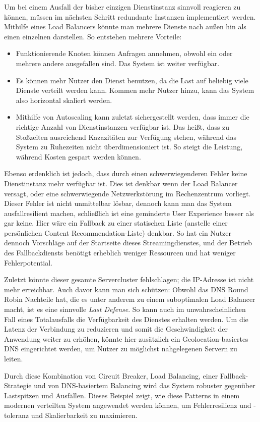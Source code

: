 Um bei einem Ausfall der bisher einzigen Dienstinstanz sinnvoll reagieren zu können, müssen im nächsten Schritt redundante Instanzen implementiert werden. Mithilfe eines Load Balancers könnte man mehrere Dienste nach außen hin als einen einzelnen darstellen. So entstehen mehrere Vorteile: 
\begin{itemize}
	\item Funktionierende Knoten können Anfragen annehmen, obwohl ein oder mehrere andere ausgefallen sind. Das System ist weiter verfügbar.
	\item Es können mehr Nutzer den Dienst benutzen, da die Last auf beliebig viele Dienste verteilt werden kann. Kommen mehr Nutzer hinzu, kann das System also horizontal skaliert werden.
	\item Mithilfe von Autoscaling kann zuletzt sichergestellt werden, dass immer die richtige Anzahl von Dienstinstanzen verfügbar ist. Das heißt, dass zu Stoßzeiten ausreichend Kazazitäten zur Verfügung stehen, während das System zu Ruhezeiten nicht überdimensioniert ist. So steigt die Leistung, während Kosten gespart werden können.
\end{itemize}

Ebenso erdenklich ist jedoch, dass durch einen schwerwiegenderen Fehler keine Dienstinstanz mehr verfügbar ist. Dies ist denkbar wenn der Load Balancer versagt, oder eine schwerwiegende Netzwerkstörung im Rechenzentrum vorliegt. Dieser Fehler ist nicht unmittelbar lösbar, dennoch kann man das System ausfallresilient machen, schließlich ist eine geminderte User Experience besser als gar keine. Hier wäre ein Fallback zu einer statischen Liste (anstelle einer persönlichen Content Recommendation-Liste) denkbar. So hat ein Nutzer dennoch Vorschläge auf der Startseite dieses Streamingdienstes, und der Betrieb des Fallbackdiensts benötigt erheblich weniger Ressourcen und hat weniger Fehlerpotential.

Zuletzt könnte dieser gesamte Servercluster fehlschlagen; die IP-Adresse ist nicht mehr erreichbar. Auch davor kann man sich schützen: Obwohl das DNS Round Robin Nachteile hat, die es unter anderem zu einem suboptimalen Load Balancer macht, ist es eine sinnvolle \textit{Last Defense}. So kann auch im unwahrscheinlichen Fall eines Totalausfalls die Verfügbarkeit des Dienstes erhalten werden. Um die Latenz der Verbindung zu reduzieren und somit die Geschwindigkeit der Anwendung weiter zu erhöhen, könnte hier zusätzlich ein Geolocation-basiertes DNS eingerichtet werden, um Nutzer zu möglichst nahgelegenen Servern zu leiten.

Durch diese Kombination von Circuit Breaker, Load Balancing, einer Fallback-Strategie und von DNS-basiertem Balancing wird das System robuster gegenüber Lastspitzen und Ausfällen. Dieses Beispiel zeigt, wie diese Patterns in einem modernen verteilten System angewendet werden können, um Fehlerresilienz und -toleranz und Skalierbarkeit zu maximieren.
